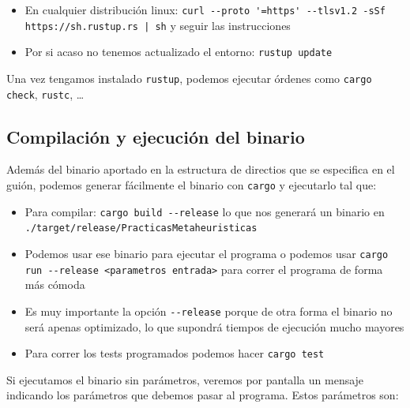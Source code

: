 \documentclass[11pt]{article}
\begin{document}
\begin{itemize}
    \item En cualquier distribución linux: \lstinline{curl --proto '=https' --tlsv1.2 -sSf https://sh.rustup.rs | sh} y seguir las instrucciones
    \item Por si acaso no tenemos actualizado el entorno: \lstinline{rustup update}
\end{itemize}

Una vez tengamos instalado \lstinline{rustup}, podemos ejecutar órdenes como \lstinline{cargo check}, \lstinline{rustc}, \ldots


\subsection{Compilación y ejecución del binario}

Además del binario aportado en la estructura de directios que se especifica en el guión, podemos generar fácilmente el binario con \lstinline{cargo} y ejecutarlo tal que:

\begin{itemize}
    \item Para compilar: \lstinline{cargo build --release} lo que nos generará un binario en \lstinline{./target/release/PracticasMetaheuristicas}
    \item Podemos usar ese binario para ejecutar el programa o podemos usar \lstinline{cargo run --release <parametros entrada>} para correr el programa de forma más cómoda
    \item Es muy importante la opción \lstinline{--release} porque de otra forma el binario no será apenas optimizado, lo que supondrá tiempos de ejecución mucho mayores
    \item Para correr los tests programados podemos hacer \lstinline{cargo test}
\end{itemize}

Si ejecutamos el binario sin parámetros, veremos por pantalla un mensaje indicando los parámetros que debemos pasar al programa. Estos parámetros son:
\end{document}
